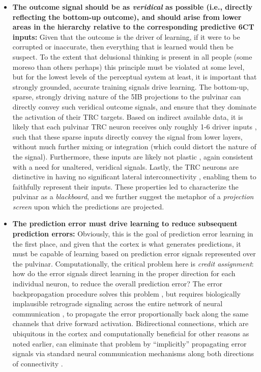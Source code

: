 \documentclass[11pt,twoside]{article}
\newif\myifpdf
\begin{document}
\begin{itemize}
	\item {\bf The outcome signal should be as \emph{veridical} as possible (i.e., directly reflecting the bottom-up outcome), and should arise from lower areas in the hierarchy relative to the corresponding predictive 6CT inputs:}  Given that the outcome is the driver of learning, if it were to be corrupted or inaccurate, then everything that is learned would then be suspect.  To the extent that delusional thinking is present in all people (some moreso than others perhaps) this principle must be violated at some level, but for the lowest levels of the perceptual system at least, it is important that strongly grounded, accurate training signals drive learning.  The bottom-up, sparse, strongly driving nature of the 5IB projections to the pulvinar can directly convey such veridical outcome signals, and ensure that they dominate the activation of their TRC targets.  Based on indirect available data, it is likely that each pulvinar TRC neuron receives only roughly 1-6 driver inputs \citep{ShermanGuillery06,ShermanGuillery11}, such that these sparse inputs directly convey the signal from lower layers, without much further mixing or integration (which could distort the nature of the signal).  Furthermore, these inputs are likely not plastic \citep{UsreySherman18}, again consistent with a need for unaltered, veridical signals.  Lastly, the TRC neurons are distinctive in having no significant lateral interconnectivity \citep{ShermanGuillery06}, enabling them to faithfully represent their inputs.  These properties led \citet{Mumford91} to characterize the pulvinar as a \emph{blackboard}, and we further suggest the metaphor of a \emph{projection screen} upon which the predictions are projected.

	\item {\bf The prediction error must drive learning to reduce subsequent prediction errors:}  Obviously, this is the goal of prediction error learning in the first place, and given that the cortex is what generates predictions, it must be capable of learning based on prediction error signals represented over the pulvinar.  Computationally, the critical problem here is \emph{credit assignment}: how do the error signals direct learning in the proper direction for each individual neuron, to reduce the overall prediction error?  The error backpropagation procedure solves this problem \citep{RumelhartHintonWilliams86}, but requires biologically implausible retrograde signaling across the entire network of neural communication \citep{Crick89}, to propagate the error proportionally back along the same channels that drive forward activation.  Bidirectional connections, which are ubiquitous in the cortex \citep{MarkovErcsey-RavaszGomesEtAl14,FellemanVanEssen91} and computationally beneficial for other reasons as noted earlier, can eliminate that problem by ``implicitly'' propagating error signals via standard neural communication mechanisms along both directions of connectivity \citep{OReilly96}.
	

\end{itemize}
\end{document}
